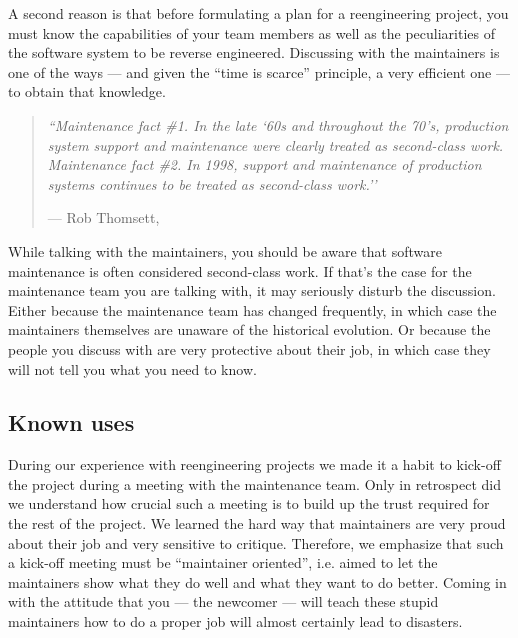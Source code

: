 \documentclass[a4paper,10pt,twoside]{book}
\begin{document}
A second reason is that before formulating a plan for a reengineering project, you must know the capabilities of your team members as well as the peculiarities of the software system to be reverse engineered. Discussing with the maintainers is one of the ways --- and given the ``time is scarce'' principle, a very efficient one --- to obtain that knowledge.

\begin{quotation}
\noindent
\emph{``Maintenance fact \#1. In the late `60s and throughout the 70's, production system support and maintenance were clearly treated as second-class work.\\
Maintenance fact \#2. In 1998, support and maintenance of production systems continues to be treated as second-class work.''}

\hfill --- Rob Thomsett, \cite{Thom98a}
\end{quotation}

While talking with the maintainers, you should be aware that software maintenance is often considered second-class work. If that's the case for the maintenance team you are talking with, it may seriously disturb the discussion. Either because the maintenance team has changed frequently, in which case the maintainers themselves are unaware of the historical evolution. Or because the people you discuss with are very protective about their job, in which case they will not tell you what you need to know. 

\subsection*{Known uses}

During our experience with reengineering projects we made it a habit to kick-off the project during a meeting with the maintenance team. Only in retrospect did we understand how crucial such a meeting is to build up the trust required for the rest of the project. We learned the hard way that maintainers are very proud about their job and very sensitive to critique. Therefore, we emphasize that such a kick-off meeting must be ``maintainer oriented'', i.e. aimed to let the maintainers show what they do well and what they want to do better. Coming in with the attitude that you --- the newcomer --- will teach these stupid maintainers how to do a proper job will almost certainly lead to disasters.
\end{document}
